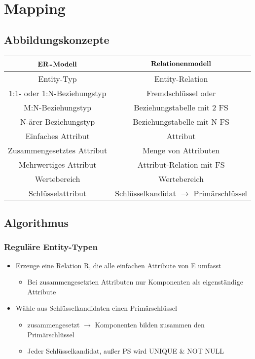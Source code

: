 \section{Mapping}
\subsection{Abbildungskonzepte}
\begin{tabular}{c|c}
	$\bold{ER}$-$\bold{Modell}$ & $\bold{Relationenmodell}$ \\
	\hline
	Entity-Typ & \glqq{}Entity\grqq{}-Relation \\
	1:1- oder 1:N-Beziehungstyp & Fremdschlüssel oder \\
	M:N-Beziehungstyp & Beziehungstabelle mit 2 FS \\
	N-ärer Beziehungstyp & Beziehungstabelle mit N FS \\
	Einfaches Attribut & Attribut \\
	Zusammengesetztes Attribut & Menge von Attributen \\
	Mehrwertiges Attribut & \glqq{}Attribut\grqq{}-Relation mit FS \\
	Wertebereich & Wertebereich \\
	Schlüsselattribut & Schlüsselkandidat $\to$ Primärschlüssel
\end{tabular}
\subsection{Algorithmus}
\subsubsection{Reguläre Entity-Typen}
\begin{itemize}
	\item Erzeuge eine Relation R, die alle einfachen Attribute von E umfasst
		\begin{itemize}
			\item Bei zusammengesetzten Attributen nur Komponenten als eigenständige Attribute
		\end{itemize}
	\item Wähle aus Schlüsselkandidaten einen Primärschlüssel
		\begin{itemize}
			\item zusammengesetzt $\to$ Komponenten bilden zusammen den Primärschlüssel
			\item Jeder Schlüsselkandidat, außer PS wird UNIQUE \& NOT NULL
		\end{itemize}
\end{itemize}
